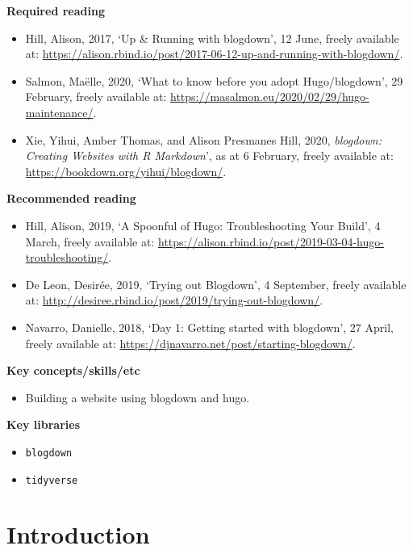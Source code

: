 \documentclass[
]{book}
\providecommand{\tightlist}{%
  \setlength{\itemsep}{0pt}\setlength{\parskip}{0pt}}
\begin{document}
\textbf{Required reading}

\begin{itemize}
\tightlist
\item
  Hill, Alison, 2017, `Up \& Running with blogdown', 12 June, freely available at: \url{https://alison.rbind.io/post/2017-06-12-up-and-running-with-blogdown/}.
\item
  Salmon, Maëlle, 2020, `What to know before you adopt Hugo/blogdown', 29 February, freely available at: \url{https://masalmon.eu/2020/02/29/hugo-maintenance/}.
\item
  Xie, Yihui, Amber Thomas, and Alison Presmanes Hill, 2020, \emph{blogdown: Creating Websites with R Markdown}', as at 6 February, freely available at: \url{https://bookdown.org/yihui/blogdown/}.
\end{itemize}

\textbf{Recommended reading}

\begin{itemize}
\tightlist
\item
  Hill, Alison, 2019, `A Spoonful of Hugo: Troubleshooting Your Build', 4 March, freely available at: \url{https://alison.rbind.io/post/2019-03-04-hugo-troubleshooting/}.
\item
  De Leon, Desirée, 2019, `Trying out Blogdown', 4 September, freely available at: \url{http://desiree.rbind.io/post/2019/trying-out-blogdown/}.
\item
  Navarro, Danielle, 2018, `Day 1: Getting started with blogdown', 27 April, freely available at: \url{https://djnavarro.net/post/starting-blogdown/}.
\end{itemize}

\textbf{Key concepts/skills/etc}

\begin{itemize}
\tightlist
\item
  Building a website using blogdown and hugo.
\end{itemize}

\textbf{Key libraries}

\begin{itemize}
\tightlist
\item
  \texttt{blogdown}
\item
  \texttt{tidyverse}
\end{itemize}

\hypertarget{introduction-6}{%
\section{Introduction}\label{introduction-6}}
\end{document}
